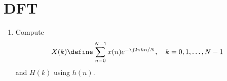 \documentclass[journal,12pt,twocolumn]{IEEEtran}
\renewcommand\thesection{\arabic{section}}
\begin{document}
\section{DFT }
\begin{enumerate}[label=\thesection.\arabic*]
\item
Compute
\begin{equation}
X(k) \define \sum _{n=0}^{N-1}x(n) e^{-\j2\pi kn/N}, \quad k = 0,1,\dots, N-1
\end{equation}
and $H(k)$ using $h(n)$.\\


\end{enumerate}
\end{document}

